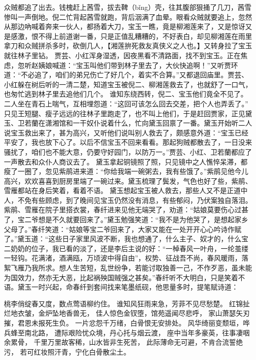 \documentclass[12pt,oneside]{book}
\begin{document}
众贼都追了出去。钱槐赶上茜雪，拔去鞞（bǐng）壳，往其腹部狠捅了几刀，茜雪惨叫一声倒地。倪二忙背起茜雪就跑，背后洇满了血晕。眼看众贼就要追上，忽然从那边吶喊着奔来一伙人，都扬着大刀，宝玉一瞧，竟是柳湘莲来了，又是惊讶又是感激，恨不得上前道谢一番，只是正值乱糟糟的，不好表白，却见柳湘莲在雨里拿刀和众贼拼杀多时，砍倒几人，【湘莲拚死救友真侠义之人也。】又转身拉了宝玉就往林子里钻。
贾芸、小红浑身湿透，因夜黑看不清路面，找不到宝玉。正在焦虑，忽听赵姨娘喊道：“宝玉叫他们带到林子里去了，大伙快追啊！”又听贾环道：“不必追了，咱们的弟兄伤亡了好几个，着实不合算。”又都退回庙里。贾芸、小红躲在树后听的一清二楚，知道宝玉被倪二、柳湘莲救去了，也就舒了一口气，也匆忙逃到林子里去追他们几个。
谁知东绕西转，倪二、宝玉他们竟全不见了。二人坐在青石上喘气，互相埋怨道：“这回可该怎么回去交差，把个人也弄丢了。”
只见王短腿、瘦子远远的往林子里跑走了，也不叫上他们，于是赶回贾家，正见黛玉、卫若蘭在潇湘馆和一干奴仆说着什么，忙向黛玉回禀了一番。黛玉开始听二人说宝玉救出来了，甚为高兴，又听他们说叫别人救去了，颇感意外道：“宝玉已经平安了，我也放下心了。以后不信宝玉不回来看看。那起狗贼都散去了，一日没来骚扰了，咱们也不能大意，仍要守好园门，以防万一。”贾芸、小红、卫若蘭都应了一声散去和众仆人商议去了。
黛玉拿起铜镜照了照，只见镜中之人憔悴呆滞，都瘦了一圈了，忽见紫鹃进来道：“你给我端一碗粥去，我有些饿了。”紫鹃见他今儿高兴，欢欢喜喜到厨房里端了一碗过来。黛玉梳理了鬓发，气色也好了些，紫鹃、雪雁都站在身后笑着，看着不语。
黛玉想起宝玉被人救去，那些人又不是正道中人，不免有些顾虑，到了晚间见宝玉仍然没有消息，有些郁闷，乃伏案独自落泪。紫鹃、雪雁在院子里搭衣裳，春纤进来见他无端哭了，劝道：“姑娘莫要伤心过甚了，宝二爷想是不久就要回来了。”黛玉勉强笑道：“我不是为他哭了，是想起家乡父母了。”春纤笑道：“姑娘等宝二爷回来了，大家又能在一处开开心心吟诗作赋了。”黛玉道：“这些日子家里风波不断，我也想通了，什么主子、奴才的，什么宝二奶奶的位子，我已看的淡了，还是李后主说的好：“一棹春风一叶舟，一纶茧缕一轻钩。花满渚，酒满瓯，万顷波中得自由”，权势、征战吾不尚，春风暖雨，落絮飞雁乃我所求。想人生苦短，乱世纷争，若能讨取独善一己，不作歹恶，虽未能为国效力，然亦无大恶，比起祸殃国贼强之甚矣。”春纤听不大明白，只是笑着不语。黛玉一时兴起，命春纤到套间找来笔墨纸砚，他思量多时，提笔赋诗道：

桃李俏绽春又度，数点莺语柳约住。
谁知风狂雨来急，芳菲不见尽愁楚。
红锦扯烂地衣皱，金炉坠地香兽无，
佳人惊色金钗堕，馆苑遥闻尽悲呼，
家山萧瑟矢刃摧，君恩未报死生负。
一片忿怨千万绪，白骨恨无安排处。
风华绮丽变颓垣，哗兵蜂至南北路，
遭际艰险忧众境，丹心托与烟云渡，
座中当年多豪英，往事凄咽余累骨，
千里万里故客稀，山水皆非生死苦，
此际薄命无可避，不肯合流誓绝污，
若可红妆照汗青，宁化白骨散尘土。
\end{document}
